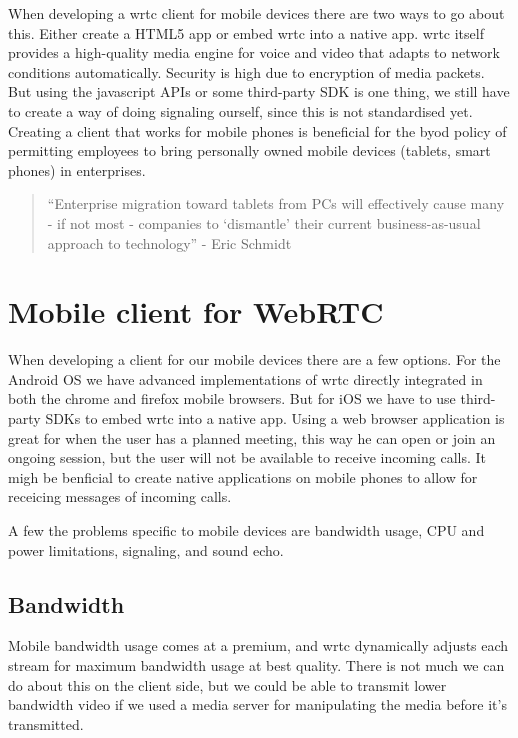 When developing a \gls{wrtc} client for mobile devices there are two ways to go about this. Either create a HTML5 app or embed \gls{wrtc} into a native app. \gls{wrtc} itself provides a high-quality media engine for voice and video that adapts to network conditions automatically. Security is high due to encryption of media packets. But using the javascript APIs or some third-party SDK is one thing, we still have to create a way of doing signaling ourself, since this is not standardised yet. Creating a client that works for mobile phones is beneficial for the \gls{byod} policy of permitting employees to bring personally owned mobile devices (tablets, smart phones) in enterprises.

\begin{quote}
``Enterprise migration toward tablets from PCs will effectively cause many - if not most - companies to `dismantle' their current business-as-usual approach to technology'' - Eric Schmidt
\end{quote}


\section{Mobile client for WebRTC}
When developing a client for our mobile devices there are a few options. For the Android OS we have advanced implementations of \gls{wrtc} directly integrated in both the chrome and firefox mobile browsers. But for iOS we have to use third-party SDKs to embed \gls{wrtc} into a native app. Using a web browser application is great for when the user has a planned meeting, this way he can open or join an ongoing session, but the user will not be available to receive incoming calls. It migh be benficial to create native applications on mobile phones to allow for receicing messages of incoming calls.

A few the problems specific to mobile devices are bandwidth usage, CPU and power limitations, signaling, and sound echo.

\subsection{Bandwidth}
Mobile bandwidth usage comes at a premium, and \gls{wrtc} dynamically adjusts each stream for maximum bandwidth usage at best quality. There is not much we can do about this on the client side, but we could be able to transmit lower bandwidth video if we used a media server for manipulating the media before it's transmitted. 


